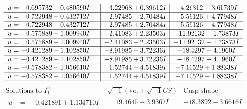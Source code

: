 \documentclass[1p]{elsarticle_modified}
\theoremstyle{definition}
\newcommand{\I}{\sqrt{-1}}
\begin{document}
$$\begin{array}{c|c|c}
\begin{aligned}
u &= -0.695732 - 0.480590 I\end{aligned}
 & \phantom{-}3.22968 + 0.39612 I & -4.26312 - 3.61739 I \\ \hline\begin{aligned}
u &= \phantom{-}0.722948 + 0.432712 I\end{aligned}
 & \phantom{-}2.97485 - 2.70484 I & -5.59126 + 4.77948 I \\ \hline\begin{aligned}
u &= \phantom{-}0.722948 - 0.432712 I\end{aligned}
 & \phantom{-}2.97485 + 2.70484 I & -5.59126 - 4.77948 I \\ \hline\begin{aligned}
u &= \phantom{-}0.575889 + 1.009940 I\end{aligned}
 & -2.41083 + 2.23503 I & -11.92132 - 1.73873 I \\ \hline\begin{aligned}
u &= \phantom{-}0.575889 - 1.009940 I\end{aligned}
 & -2.41083 - 2.23503 I & -11.92132 + 1.73873 I \\ \hline\begin{aligned}
u &= -0.421289 + 1.102850 I\end{aligned}
 & -8.91985 - 3.72236 I & -18.4297 + 4.1960 I \\ \hline\begin{aligned}
u &= -0.421289 - 1.102850 I\end{aligned}
 & -8.91985 + 3.72236 I & -18.4297 - 4.1960 I \\ \hline\begin{aligned}
u &= -0.578382 + 1.056610 I\end{aligned}
 & \phantom{-}1.52744 - 4.51839 I & -7.10529 + 1.88338 I \\ \hline\begin{aligned}
u &= -0.578382 - 1.056610 I\end{aligned}
 & \phantom{-}1.52744 + 4.51839 I & -7.10529 - 1.88338 I\\
 \hline 
 \end{array}$$\newpage$$\begin{array}{c|c|c}  
\text{Solutions to }I^u_{1}& \I (\text{vol} + \sqrt{-1}CS) & \text{Cusp shape}\\
 \hline 
\begin{aligned}
u &= \phantom{-}0.421891 + 1.134710 I\end{aligned}
 & \phantom{-}19.4645 + 3.9367 I & -18.3892 - 3.6616 I \\ \hline\begin{aligned}

\end{aligned}
\end{array}$$
\end{document}
